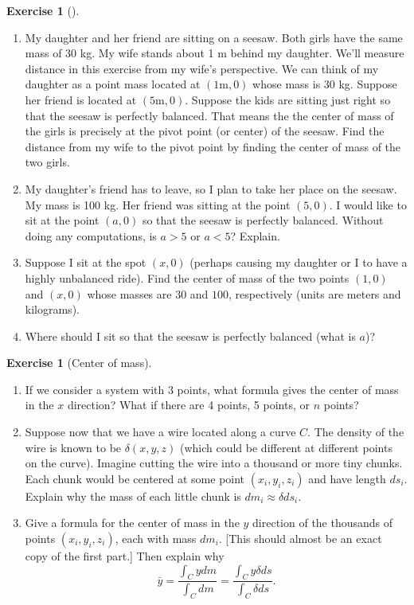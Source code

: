 \documentclass[10pt,]{book}
\theoremstyle{plain}
\theoremstyle{definition}
\theoremstyle{definition}
\theoremstyle{definition}
\theoremstyle{definition}
\newtheorem{exploration}[project]{Exercise}
\theoremstyle{definition}
\numberwithin{equation}{section}
\newcommand{\lt}{<}
\begin{document}
\begin{exploration}[]\label{exploration-221}
\leavevmode%
\begin{enumerate}[font=\bfseries,label=(\alph*),ref=\alph*]
\item\label{task-570} My daughter and her friend are sitting on a seesaw.  Both girls have the same mass of 30 kg. My wife stands about 1 m behind my daughter. We'll measure distance in this exercise from my wife's perspective.  We can think of my daughter as a point mass located at \((1\text{m} ,0)\) whose mass is \(30\) kg. Suppose her friend is located at \((5\text{m} ,0)\). Suppose the kids are sitting just right so that the seesaw is perfectly balanced.  That means the the center of mass of the girls is precisely at the pivot point (or center) of the seesaw. Find the distance from my wife to the pivot point by finding the center of mass of the two girls.%
\item\label{task-571} My daughter's friend has to leave, so I plan to take her place on the seesaw. My mass is 100 kg. Her friend was sitting at the point \((5,0)\). I would like to sit at the point \((a,0)\) so that the seesaw is perfectly balanced. Without doing any computations, is \(a>5\) or \(a\lt 5\)? Explain.%
\item\label{task-572} Suppose I sit at the spot \((x,0)\) (perhaps causing my daughter or I to have a highly unbalanced ride). Find the center of mass of the two points \((1,0)\) and \((x,0)\) whose masses are \(30\) and \(100\), respectively (units are meters and kilograms).%
\item\label{task-573} Where should I sit so that the seesaw is perfectly balanced (what is \(a\))?%
\end{enumerate}
\end{exploration}
\begin{exploration}[Center of mass]\label{center_of_mass_of_curve}
\leavevmode%
\begin{enumerate}[font=\bfseries,label=(\alph*),ref=\alph*]
\item\label{task-574} If we consider a system with 3 points, what formula gives the center of mass in the \(x\) direction? What if there are 4 points, 5 points, or \(n\) points?%
\item\label{task-575} Suppose now that we have a wire located along a curve \(C\). The density of the wire is known to be \(\delta(x,y,z)\) (which could be different at different points on the curve).  Imagine cutting the wire into a thousand or more tiny chunks.  Each chunk would be centered at some point \((x_i,y_i,z_i)\) and have length \(ds_i\). Explain why the mass of each little chunk is \(dm_i\approx\delta ds_i\).%
\item\label{task-576} Give a formula for the center of mass in the \(y\) direction of the thousands of points \((x_i,y_i,z_i)\), each with mass \(dm_i\). [This should almost be an exact copy of the first part.] Then explain why%
\begin{equation*}
\bar y = \frac{\int_C y dm}{\int_C dm}=\frac{\int_C y \delta ds}{\int_C \delta ds}.
\end{equation*}
%
\end{enumerate}
\end{exploration}
\end{document}
